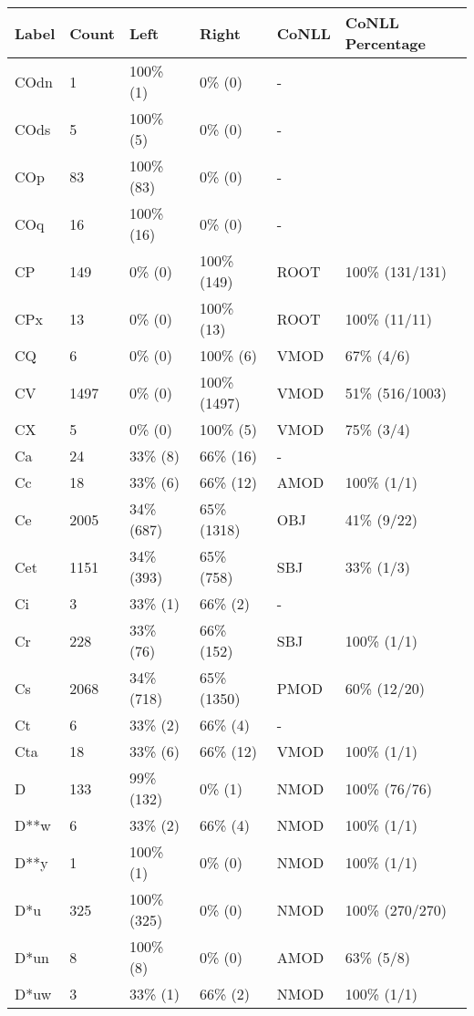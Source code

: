 \begin{figure*}
\begin{tabular}{|l|l|l|l||l|l|}
\hline
Label & Count & Left & Right & CoNLL & CoNLL Percentage\\ 
\hline
 COdn & 1 & 100\% (1) & 0\% (0) & - &  \\ 
\hline
 COds & 5 & 100\% (5) & 0\% (0) & - &  \\ 
\hline
 COp & 83 & 100\% (83) & 0\% (0) & - &  \\ 
\hline
 COq & 16 & 100\% (16) & 0\% (0) & - &  \\ 
\hline
 CP & 149 & 0\% (0) & 100\% (149) & ROOT & 100\% (131/131) \\ 
\hline
 CPx & 13 & 0\% (0) & 100\% (13) & ROOT & 100\% (11/11) \\ 
\hline
 CQ & 6 & 0\% (0) & 100\% (6) & VMOD & 67\% (4/6) \\ 
\hline
 CV & 1497 & 0\% (0) & 100\% (1497) & VMOD & 51\% (516/1003) \\ 
\hline
 CX & 5 & 0\% (0) & 100\% (5) & VMOD & 75\% (3/4) \\ 
\hline
 Ca & 24 & 33\% (8) & 66\% (16) & - &  \\ 
\hline
 Cc & 18 & 33\% (6) & 66\% (12) & AMOD & 100\% (1/1) \\ 
\hline
 Ce & 2005 & 34\% (687) & 65\% (1318) & OBJ & 41\% (9/22) \\ 
\hline
 Cet & 1151 & 34\% (393) & 65\% (758) & SBJ & 33\% (1/3) \\ 
\hline
 Ci & 3 & 33\% (1) & 66\% (2) & - &  \\ 
\hline
 Cr & 228 & 33\% (76) & 66\% (152) & SBJ & 100\% (1/1) \\ 
\hline
 Cs & 2068 & 34\% (718) & 65\% (1350) & PMOD & 60\% (12/20) \\ 
\hline
 Ct & 6 & 33\% (2) & 66\% (4) & - &  \\ 
\hline
 Cta & 18 & 33\% (6) & 66\% (12) & VMOD & 100\% (1/1) \\ 
\hline
 D & 133 & 99\% (132) & 0\% (1) & NMOD & 100\% (76/76) \\ 
\hline
 D**w & 6 & 33\% (2) & 66\% (4) & NMOD & 100\% (1/1) \\ 
\hline
 D**y & 1 & 100\% (1) & 0\% (0) & NMOD & 100\% (1/1) \\ 
\hline
 D*u & 325 & 100\% (325) & 0\% (0) & NMOD & 100\% (270/270) \\ 
\hline
 D*un & 8 & 100\% (8) & 0\% (0) & AMOD & 63\% (5/8) \\ 
\hline
 D*uw & 3 & 33\% (1) & 66\% (2) & NMOD & 100\% (1/1) \\ 

\end{tabular}
\end{figure*}
